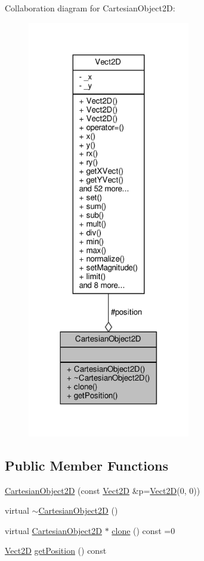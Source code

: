 Collaboration diagram for Cartesian\+Object2D\+:\nopagebreak
\begin{figure}[H]
\begin{center}
\leavevmode
\includegraphics[width=201pt]{classCartesianObject2D__coll__graph}
\end{center}
\end{figure}
\subsection*{Public Member Functions}
\begin{DoxyCompactItemize}
\item 
\hyperlink{classCartesianObject2D_a4e32dae738f975ef1d323b2810fc0b72_a4e32dae738f975ef1d323b2810fc0b72}{Cartesian\+Object2D} (const \hyperlink{classVect2D}{Vect2D} \&p=\hyperlink{classVect2D}{Vect2D}(0, 0))
\item 
virtual \hyperlink{classCartesianObject2D_a16f2f813e178802ec316fcedae39f7af_a16f2f813e178802ec316fcedae39f7af}{$\sim$\+Cartesian\+Object2D} ()
\item 
virtual \hyperlink{classCartesianObject2D}{Cartesian\+Object2D} $\ast$ \hyperlink{classCartesianObject2D_afd883b92328b20defd9ed7af581206ab_afd883b92328b20defd9ed7af581206ab}{clone} () const =0
\item 
\hyperlink{classVect2D}{Vect2D} \hyperlink{classCartesianObject2D_aa3a6b63777852ab9eb9408ed2536abe2_aa3a6b63777852ab9eb9408ed2536abe2}{get\+Position} () const
\end{DoxyCompactItemize}
